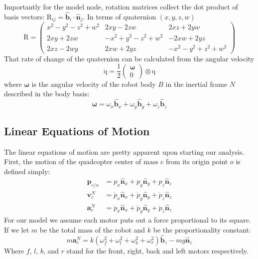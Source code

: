 \documentclass[lettersize,journal]{IEEEtran}
\begin{document}
Importantly for the model node, rotation matrices collect the dot product of basis vectors: $\mathrm{R}_{ij} = \mathbf{\hat{b}}_i \cdot \mathbf{\hat{n}}_j$. In terms of quaternion $(x, y, z, w)$
\begin{equation}
  \mathrm{R}=\left(
  \begin{smallmatrix}
    x^2-y^2-z^2+w^2 & 2xy-2zw & 2xz+2yw \\
    2xy+2zw & -x^2+y^2-z^2+w^2 & -2xw+2yz \\
    2xz-2wy & 2xw+2yz & -x^2-y^2+z^2+w^2
  \end{smallmatrix} 
  \right) \label{EQN:RotationMatrix}
\end{equation}
That rate of change of the quaternion can be calculated from the angular velocity
\begin{equation}
  \mathrm{\dot{q}} = \frac{1}{2}
  \begin{pmatrix}
    \boldsymbol\omega \\
    0
  \end{pmatrix}
  \otimes \mathrm{q} \label{EQN:QuaternionVelocity}
\end{equation}
where $\boldsymbol\omega$ is the angular velocity of the robot body $B$ in the inertial frame $N$ described in the body basis:
\begin{equation}
  \boldsymbol\omega = \omega_x \mathbf{\hat{b}}_x + \omega_y \mathbf{\hat{b}}_y + \omega_z \mathbf{\hat{b}}_z \label{EQN:AngularVelocity}
\end{equation}
\subsection{Linear Equations of Motion}
The linear equations of motion are pretty apparent upon starting our analysis.
First, the motion of the quadcopter center of mass $c$ from its origin point $o$ is defined simply:
\begin{align}
  \mathbf{p}_{c/o} &= p_x \mathbf{\hat{n}}_x + p_y \mathbf{\hat{n}}_y + p_z \mathbf{\hat{n}}_z \\
  \mathbf{v}^N_c &= \dot{p}_x \mathbf{\hat{n}}_x + \dot{p}_y \mathbf{\hat{n}}_y + \dot{p}_z \mathbf{\hat{n}}_z \\
  \mathbf{a}^N_c &= \ddot{p}_x \mathbf{\hat{n}}_x + \ddot{p}_y \mathbf{\hat{n}}_y + \ddot{p}_z \mathbf{\hat{n}}_z \label{EQN:Acceleration}
\end{align}
For our model we assume each motor puts out a force proportional to its square.
If we let $m$ be the total mass of the robot and $k$ be the proportionality constant:
\begin{equation}
  m\mathbf{a}^N_c = k \left(\omega_f^2 + \omega_l^2 + \omega_b^2 + \omega_r^2\right) \mathbf{\hat{b}}_z - mg \mathbf{\hat{n}}_z \label{EQN:LinearEOM}
\end{equation}
Where $f$, $l$, $b$, and $r$ stand for the front, right, back and left motors respectively. 
\end{document}
